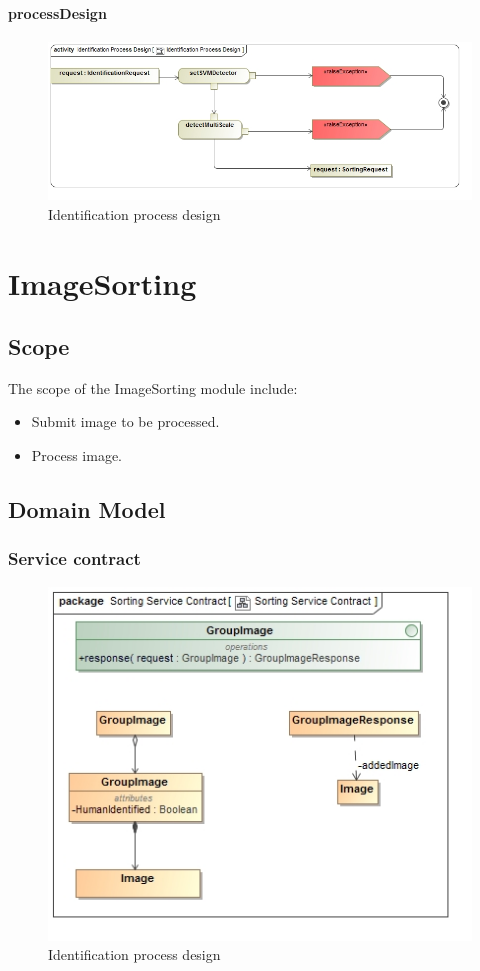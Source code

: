 \documentclass[a4paper,12pt]{report}
\begin{document}
			\paragraph {processDesign}
				\begin{figure}[htb]
					\centering
					\includegraphics [scale=0.5]{../Diagrams/Identification_Process_Design.jpg}
					\caption{Identification process design}
				\end{figure}	

\section {ImageSorting}
		\FloatBarrier	
		\subsection {Scope}
		The scope of the ImageSorting module include:
			\begin {itemize}
				\item Submit image to be processed.
				\item Process image.
			\end {itemize}
	
	\FloatBarrier		
	\subsection {Domain Model}
		\FloatBarrier	
		\subsubsection {Service contract}		
		\begin{figure}[htb]
			\centering
			\includegraphics [scale=0.5]{../Diagrams/Sorting_Service_Contract.jpg}
			\caption{Identification process design}
		\end{figure}
		
\end{document}
